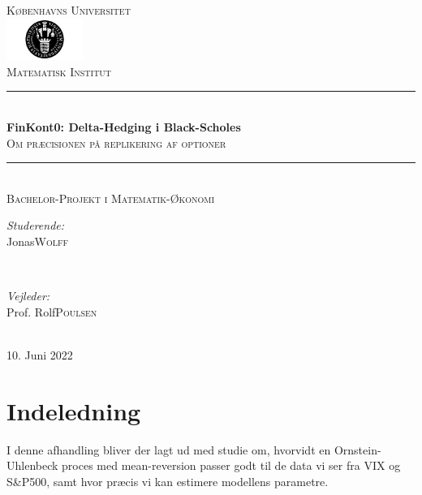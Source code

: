\documentclass{article}
\title{\thesistitle}
\author{\thesisauthorfirst\space\thesisauthorsecond}
\date{\thesisdate}
\def\thesistitle{FinKont0: Delta-Hedging i Black-Scholes}
\def\thesissubtitle{Om præcisionen på replikering af optioner}
\def\thesisauthorfirst{Jonas}
\def\thesisauthorsecond{Wolff}
\def\thesissupervisorfirst{Prof. Rolf}
\def\thesissupervisorsecond{Poulsen}
\def\thesissecondreaderfirst{Prof. Anders}
\def\thesissecondreadersecond{And}
\def\thesisdate{10. Juni 2022}
\theoremstyle{definition}
\theoremstyle{remark}
\begin{document}
\begin{titlepage}
	\thispagestyle{empty}
	\newcommand{\HRule}{\rule{\linewidth}{0.5mm}}
	\center
	\textsc{\Large Københavns Universitet}\\[.7cm]
	\includegraphics[width=25mm]{img/ku_segl.png}\\[.5cm]
	\textsc{Matematisk Institut}\\[0.5cm]
	
	\HRule \\[0.4cm]
	{ \huge \bfseries \thesistitle}\\[0.1cm]
	\textsc{\thesissubtitle}\\
	\HRule \\[.5cm]
	\textsc{\large Bachelor-Projekt i Matematik-Økonomi}\\[.5cm]
	
	\begin{minipage}{0.4\textwidth}
	\begin{flushleft} \large
	\emph{Studerende:}\\
	\thesisauthorfirst\space \textsc{\thesisauthorsecond}
	\end{flushleft}
	\end{minipage}
	~
	\begin{minipage}{0.4\textwidth}
	\begin{flushright} \large
	\emph{Vejleder:} \\
	\thesissupervisorfirst\space \textsc{\thesissupervisorsecond} \\[1em]
	\end{flushright}
	\end{minipage}\\[4cm]
	\vfill
	{\large \thesisdate}\\
	\clearpage
\end{titlepage}

\tableofcontents

\newpage
\setcounter{section}{-1}
\section{Indeledning}
I denne afhandling bliver der lagt ud med studie om, hvorvidt en Ornstein-Uhlenbeck proces med mean-reversion passer godt til de data vi ser fra VIX og S\&P500, samt hvor præcis vi kan estimere modellens parametre.
\end{document}
